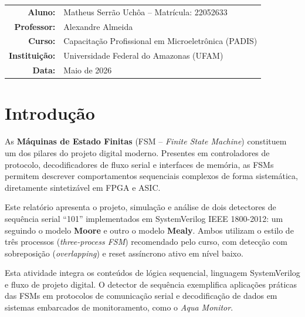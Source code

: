 \documentclass[12pt,a4paper]{article}
\begin{document}
\begin{titlepage}
  \begin{tabular}{rl}
    \textbf{Aluno:} & Matheus Serrão Uchôa -- Matrícula: 22052633 \\[4pt]
    \textbf{Professor:} & Alexandre Almeida \\[4pt]
    \textbf{Curso:} & Capacitação Profissional em Microeletrônica (PADIS) \\[4pt]
    \textbf{Instituição:} & Universidade Federal do Amazonas (UFAM) \\[4pt]
    \textbf{Data:} & Maio de 2026
  \end{tabular}
\end{titlepage}

\tableofcontents
\newpage

\section{Introdução}

As \textbf{Máquinas de Estado Finitas} (FSM -- \textit{Finite State Machine}) constituem
um dos pilares do projeto digital moderno. Presentes em controladores de protocolo,
decodificadores de fluxo serial e interfaces de memória, as FSMs permitem descrever
comportamentos sequenciais complexos de forma sistemática, diretamente sintetizável
em FPGA e ASIC.

Este relatório apresenta o projeto, simulação e análise de dois detectores de sequência
serial ``101'' implementados em SystemVerilog IEEE 1800-2012: um seguindo o modelo
\textbf{Moore} e outro o modelo \textbf{Mealy}. Ambos utilizam o estilo de três
processos (\textit{three-process FSM}) recomendado pelo curso, com detecção com
sobreposição (\textit{overlapping}) e reset assíncrono ativo em nível baixo.

\begin{unidadebox}
  Esta atividade integra os conteúdos de lógica sequencial, linguagem SystemVerilog
  e fluxo de projeto digital. O detector de sequência exemplifica aplicações práticas
  das FSMs em protocolos de comunicação serial e decodificação de dados em sistemas
  embarcados de monitoramento, como o \textit{Aqua Monitor}.
\end{unidadebox}

\end{document}
